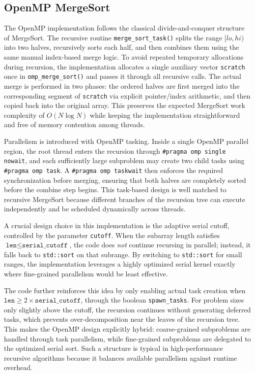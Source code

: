 \documentclass[12pt, a4paper]{article}
\begin{document}
\subsection{OpenMP MergeSort}
The OpenMP implementation follows the classical divide-and-conquer structure of MergeSort. The recursive routine \texttt{merge\_sort\_task()} splits the range $[lo, hi)$ into two halves, recursively sorts each half, and then combines them using the same manual index-based merge logic. To avoid repeated temporary allocations during recursion, the implementation allocates a single auxiliary vector \texttt{scratch} once in \texttt{omp\_merge\_sort()} and passes it through all recursive calls. The actual merge is performed in two phases: the ordered halves are first merged into the corresponding segment of \texttt{scratch} via explicit pointer/index arithmetic, and then copied back into the original array. This preserves the expected MergeSort work complexity of $O(N \log N)$ while keeping the implementation straightforward and free of memory contention among threads.

Parallelism is introduced with OpenMP tasking. Inside a single OpenMP parallel region, the root thread enters the recursion through \texttt{\#pragma omp single nowait}, and each sufficiently large subproblem may create two child tasks using \texttt{\#pragma omp task}. A \texttt{\#pragma omp taskwait} then enforces the required synchronization before merging, ensuring that both halves are completely sorted before the combine step begins. This task-based design is well matched to recursive MergeSort because different branches of the recursion tree can execute independently and be scheduled dynamically across threads.

A crucial design choice in this implementation is the adaptive serial cutoff, controlled by the parameter \texttt{cutoff}. When the subarray length satisfies $\texttt{len} \le \texttt{serial\_cutoff}$, the code does \emph{not} continue recursing in parallel; instead, it falls back to \texttt{std::sort} on that subrange. By switching to \texttt{std::sort} for small ranges, the implementation leverages a highly optimized serial kernel exactly where fine-grained parallelism would be least effective.

The code further reinforces this idea by only enabling actual task creation when $\texttt{len} \ge 2 \times \texttt{serial\_cutoff}$, through the boolean \texttt{spawn\_tasks}. For problem sizes only slightly above the cutoff, the recursion continues without generating deferred tasks, which prevents over-decomposition near the leaves of the recursion tree. This makes the OpenMP design explicitly hybrid: coarse-grained subproblems are handled through task parallelism, while fine-grained subproblems are delegated to the optimized serial sort. Such a structure is typical in high-performance recursive algorithms because it balances available parallelism against runtime overhead.
\end{document}
